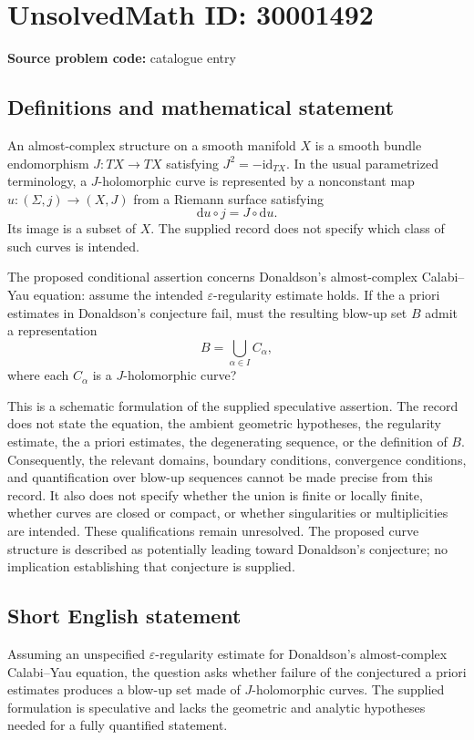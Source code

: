 \documentclass[11pt]{article}
\begin{document}
\section*{UnsolvedMath ID: 30001492}
\textbf{Source problem code:} catalogue entry
\subsection{Definitions and mathematical statement}
An almost-complex structure on a smooth manifold \(X\) is a smooth bundle endomorphism \(J:TX\to TX\) satisfying \(J^2=-\mathrm{id}_{TX}\). In the usual parametrized terminology, a \(J\)-holomorphic curve is represented by a nonconstant map \(u:(\Sigma,j)\to(X,J)\) from a Riemann surface satisfying
\[
\mathrm{d}u\circ j=J\circ\mathrm{d}u.
\]
Its image is a subset of \(X\). The supplied record does not specify which class of such curves is intended.

The proposed conditional assertion concerns Donaldson's almost-complex Calabi--Yau equation: assume the intended \(\varepsilon\)-regularity estimate holds. If the a priori estimates in Donaldson's conjecture fail, must the resulting blow-up set \(B\) admit a representation
\[
B=\bigcup_{\alpha\in I}C_\alpha,
\]
where each \(C_\alpha\) is a \(J\)-holomorphic curve?

This is a schematic formulation of the supplied speculative assertion. The record does not state the equation, the ambient geometric hypotheses, the regularity estimate, the a priori estimates, the degenerating sequence, or the definition of \(B\). Consequently, the relevant domains, boundary conditions, convergence conditions, and quantification over blow-up sequences cannot be made precise from this record. It also does not specify whether the union is finite or locally finite, whether curves are closed or compact, or whether singularities or multiplicities are intended. These qualifications remain unresolved. The proposed curve structure is described as potentially leading toward Donaldson's conjecture; no implication establishing that conjecture is supplied.
\subsection{Short English statement}
Assuming an unspecified \(\varepsilon\)-regularity estimate for Donaldson's almost-complex Calabi--Yau equation, the question asks whether failure of the conjectured a priori estimates produces a blow-up set made of \(J\)-holomorphic curves. The supplied formulation is speculative and lacks the geometric and analytic hypotheses needed for a fully quantified statement.
\end{document}
